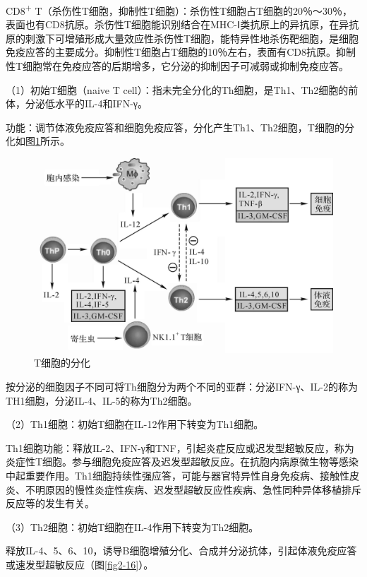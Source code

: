 CD8\textsuperscript{+}
T（杀伤性T细胞，抑制性T细胞）：杀伤性T细胞占T细胞的20％～30％，表面也有CD8抗原。杀伤性T细胞能识别结合在MHC-Ⅰ类抗原上的异抗原，在异抗原的刺激下可增殖形成大量效应性杀伤性T细胞，能特异性地杀伤靶细胞，是细胞免疫应答的主要成分。抑制性T细胞占T细胞的10％左右，表面有CD8抗原。抑制性T细胞常在免疫应答的后期增多，它分泌的抑制因子可减弱或抑制免疫应答。

（1）初始T细胞（naive T
cell）：指未完全分化的Th细胞，是Th1、Th2细胞的前体，分泌低水平的IL-4和IFN-γ。

功能：调节体液免疫应答和细胞免疫应答，分化产生Th1、Th2细胞，T细胞的分化如图\ref{fig2-15}所示。

\begin{figure}[!htbp]
 \centering
 \includegraphics{./images/Image00040.jpg}
 \caption{T细胞的分化}
 \label{fig2-15}
  \end{figure} 

按分泌的细胞因子不同可将Th细胞分为两个不同的亚群：分泌IFN-γ、IL-2的称为TH1细胞，分泌IL-4、IL-5的称为Th2细胞。

（2）Th1细胞：初始T细胞在IL-12作用下转变为Th1细胞。

Th1细胞功能：释放IL-2、IFN-γ和TNF，引起炎症反应或迟发型超敏反应，称为炎症性T细胞。参与细胞免疫应答及迟发型超敏反应。在抗胞内病原微生物等感染中起重要作用。Th1细胞持续性强应答，可能与器官特异性自身免疫病、接触性皮炎、不明原因的慢性炎症性疾病、迟发型超敏反应性疾病、急性同种异体移植排斥反应等的发生有关。

（3）Th2细胞：初始T细胞在IL-4作用下转变为Th2细胞。

释放IL-4、5、6、10，诱导B细胞增殖分化、合成并分泌抗体，引起体液免疫应答或速发型超敏反应（图\ref{fig2-16}）。

